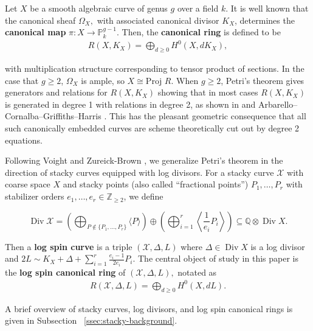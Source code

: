 \documentclass{amsart}
\theoremstyle{plain}
\theoremstyle{definition}
\theoremstyle{remark}
\numberwithin{equation}{section}
\newcommand\BQ{{\mathbb Q}}
\newcommand\BP{{\mathbb P}}
\newcommand\BZ{{\mathbb Z}}
\newcommand\proj{\text{Proj }}
\DeclareMathOperator\di{Div}
\newcommand\sx{\mathscr X}
\newcommand \subhalf[1]{\frac{{#1} - 1}{2{#1}}}
\newcommand{\halfcan}{L}
\begin{document}
Let $X$ be a smooth algebraic curve of genus $g$ over a field $k$.
It is well known that the canonical sheaf $\Omega _X,$ with
associated canonical divisor $K_X$, determines the {\bf canonical
map } $\pi: X \rightarrow \BP_k^{g - 1}$. Then, the {\bf canonical
ring} is defined to be
\begin{align*}
	R(X, K_X) = \bigoplus_{d \geq 0} H^0(X, dK_X),
\end{align*}

\noindent
with multiplication structure corresponding to tensor product of
sections. In the case that $g \geq 2$, $\Omega_X$ is ample, so $X
\cong \proj R$. When $g \geq 2$, Petri's theorem gives generators
and relations for $R(X, K_X)$ showing that in most cases $R(X, K_X)$
is generated in degree 1 with relations in degree 2, as shown in
\cite[p. 157]{saint-donat:proj} and Arbarello--Cornalba--Griffiths--Harris
\cite[Section 3.3]{acgh:algebraic-curves}. This has the pleasant 
geometric consequence that all such canonically embedded curves are
scheme theoretically cut out by degree 2 equations.

Following Voight and Zureick-Brown \cite{vzb:stacky}, we generalize 
Petri's theorem in the direction of stacky curves equipped with
log divisors. For a stacky curve $\sx$ with coarse space $X$ and
stacky points (also called ``fractional points'') $P_1, \ldots, P_r$
with stabilizer orders $e_1, \ldots, e_r \in \BZ_{\geq 2}$, we define

\[
	\di \sx = \left(\bigoplus_{P\notin \{P_1,\ldots, P_r\}} \langle 
	P \rangle \right) \oplus \left(\bigoplus_{i = 1}^r \left \langle 
	\frac{1}{e_i}P_i \right \rangle \right) \subseteq \BQ \otimes \di X.
\]

Then a {\bf log spin curve} is a triple $(\sx, \Delta, \halfcan)$
where $\Delta \in \di X$ is a log divisor and $2\halfcan \sim K_X +
\Delta + \sum_{i = 1}^{r} \subhalf{e_i} P_i$. The central object of
study in this paper is the {\bf log spin canonical ring} of $(\sx,
\Delta, \halfcan),$ notated as
\begin{align*}
	R(\sx, \Delta, \halfcan) = \bigoplus_{d \geq 0} H^0(X, d \halfcan).
\end{align*}

\noindent
A brief overview of stacky curves, log divisors, and log spin
canonical rings is given in Subsection
~\ref{ssec:stacky-background}.

\end{document}
